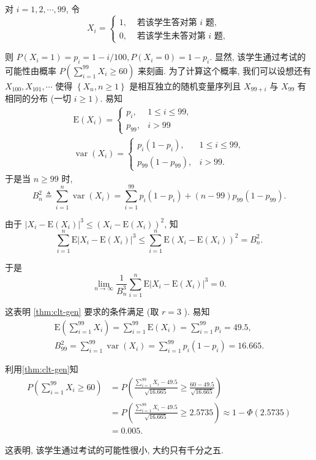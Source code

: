      \begin{solution}
        对 $i=1,2, \cdots, 99$, 令
$$
X_i= \begin{cases}1, & \text { 若该学生答对第 } i \text { 题, } \\ 0, & \text { 若该学生未答对第 } i \text { 题, }\end{cases}
$$

则 $P\left(X_i=1\right)=p_i=1-i / 100, P\left(X_i=0\right)=1-p_i$.
显然, 该学生通过考试的可能性由概率 $P\left(\sum_{i=1}^{99} X_i \geqslant 60\right)$ 来刻画. 为了计算这个概率, 我们可以设想还有 $X_{100}, X_{101}, \cdots$ 使得 $\left\{X_n, n \geqslant 1\right\}$ 是相互独立的随机变量序列且 $X_{99+i}$ 与 $X_{99}$ 有相同的分布 (一切 $\left.i \geqslant 1\right)$. 易知
$$
\begin{gathered}
\mathrm{E}\left(X_i\right)= \begin{cases}p_i, & 1 \leqslant i \leqslant 99, \\
p_{99}, & i>99\end{cases} \\
\operatorname{var}\left(X_i\right)= \begin{cases}p_i\left(1-p_i\right), & 1 \leqslant i \leqslant 99, \\
p_{99}\left(1-p_{99}\right), & i>99 .\end{cases}
\end{gathered}
$$
于是当 $n \geqslant 99$ 时,
$$
B_n^2 \triangleq \sum_{i=1}^n \operatorname{var}\left(X_i\right)=\sum_{i=1}^{99} p_i\left(1-p_i\right)+(n-99) p_{99}\left(1-p_{99}\right) .
$$

由于 $\left|X_i-\mathrm{E}\left(X_i\right)\right|^3 \leqslant\left(X_i-\mathrm{E}\left(X_i\right)\right)^2$, 知
$$
\sum_{i=1}^n \mathrm{E}\left|X_i-\mathrm{E}\left(X_i\right)\right|^3 \leqslant \sum_{i=1}^n \mathrm{E}\left(X_i-\mathrm{E}\left(X_i\right)\right)^2=B_n^2 .
$$

于是$$
\lim _{n \rightarrow \infty} \frac{1}{B_n^3} \sum_{i=1}^n \mathrm{E}\left|X_i-\mathrm{E}\left(X_i\right)\right|^3=0 .
$$

这表明 \cref{thm:clt-gen} 要求的条件满足 (取 $r=3$ ). 易知
$$
\begin{gathered}
\mathrm{E}\left(\sum_{i=1}^{99} X_i\right)=\sum_{i=1}^{99} \mathrm{E}\left(X_i\right)=\sum_{i=1}^{99} p_i=49.5, \\
B_{99}^2=\sum_{i=1}^{99} \operatorname{var}\left(X_i\right)=\sum_{i=1}^{99} p_i\left(1-p_i\right)=16.665 .
\end{gathered}
$$

利用\cref{thm:clt-gen}知
$$
\begin{aligned}
P\left(\sum_{i=1}^{99} X_i \geqslant 60\right)&=P\left(\frac{\sum_{i=1}^{99} X_i-49.5}{\sqrt{16.665}} \geqslant \frac{60-49.5}{\sqrt{16.665}}\right)  \\
& =P\left(\frac{\sum_{i=1}^{99} X_i-49.5}{\sqrt{16.665}} \geqslant 2.5735\right) \approx 1-\Phi(2.5735) \\
& =0.005 .
\end{aligned}
$$

这表明, 该学生通过考试的可能性很小, 大约只有千分之五.
     \end{solution}